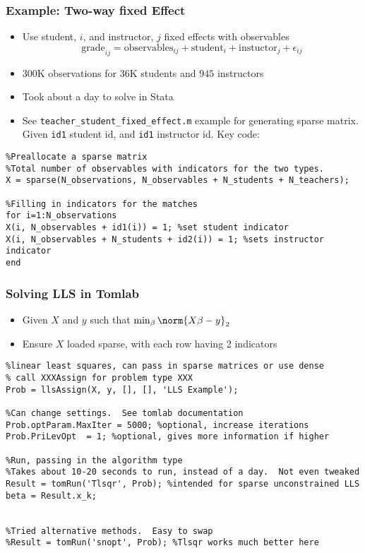 \documentclass[nofootline]{etk-presentation}
\begin{document}
\begin{frame}[fragile]	\frametitle{Example: Two-way fixed Effect}


	\begin{itemize}
		\item 	Use student, $i$, and instructor, $j$ fixed effects with observables
			$$
		\text{grade}_{ij} = \text{observables}_{ij} + \text{student}_i + \text{instuctor}_j + \epsilon_{ij}
		$$
		\item $300$K observations for $36$K students and $945$ instructors
		\item Took about a day to solve in Stata
		\item See \verb!teacher_student_fixed_effect.m! example for generating sparse matrix.  Given \verb!id1! student id, and \verb!id1! instructor id.  Key code:
	\end{itemize}
\begin{verbatim}
%Preallocate a sparse matrix
%Total number of observables with indicators for the two types.
X = sparse(N_observations, N_observables + N_students + N_teachers); 

%Filling in indicators for the matches
for i=1:N_observations
X(i, N_observables + id1(i)) = 1; %set student indicator
X(i, N_observables + N_students + id2(i)) = 1; %sets instructor indicator
end
\end{verbatim}
 \end{frame}

\begin{frame}[fragile]	\frametitle{Solving LLS in Tomlab}
	\begin{itemize}
		\item Given $X$ and $y$ such that $\min_\beta\norm{X \beta - y}_2$
		\item Ensure $X$ loaded sparse, with each row having 2 indicators
	\end{itemize}
\begin{verbatim}
%linear least squares, can pass in sparse matrices or use dense
% call XXXAssign for problem type XXX
Prob = llsAssign(X, y, [], [], 'LLS Example'); 

%Can change settings.  See tomlab documentation
Prob.optParam.MaxIter = 5000; %optional, increase iterations
Prob.PriLevOpt  = 1; %optional, gives more information if higher

%Run, passing in the algorithm type
%Takes about 10-20 seconds to run, instead of a day.  Not even tweaked
Result = tomRun('Tlsqr', Prob); %intended for sparse unconstrained LLS
beta = Result.x_k;
 

%Tried alternative methods.  Easy to swap
%Result = tomRun('snopt', Prob); %Tlsqr works much better here
\end{verbatim}
\end{frame}
	
\end{document}
